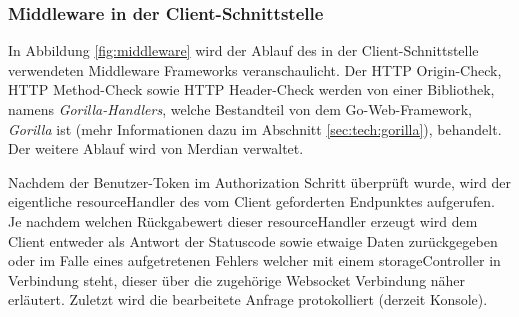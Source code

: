 \subsubsection{Middleware in der Client-Schnittstelle}
In Abbildung \ref{fig:middleware} wird der Ablauf des in der Client-Schnittstelle verwendeten Middleware Frameworks veranschaulicht. Der HTTP Origin-Check, HTTP Method-Check sowie HTTP Header-Check werden von einer Bibliothek, namens \textit{Gorilla-Handlers}, welche Bestandteil von dem Go-Web-Framework, \textit{Gorilla} ist (mehr Informationen dazu im Abschnitt \ref{sec:tech:gorilla}), behandelt. Der weitere Ablauf wird von Merdian verwaltet.\medskip

\noindent
Nachdem der Benutzer-Token im Authorization Schritt überprüft wurde, wird der eigentliche \gls{resourceHandler} des vom Client geforderten Endpunktes aufgerufen. Je nachdem welchen Rückgabewert dieser \gls{resourceHandler} erzeugt wird dem Client entweder als Antwort der Statuscode sowie etwaige Daten zurückgegeben oder im Falle eines aufgetretenen Fehlers welcher mit einem \gls{storageController} in Verbindung steht, dieser über die zugehörige Websocket Verbindung näher erläutert. Zuletzt wird die bearbeitete Anfrage protokolliert (derzeit Konsole).
\vspace*{\fill}
\begin{center}
    \label{fig:middleware}
\end{center}
\vfill

\newpage
